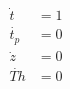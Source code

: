 \documentclass[10pt]{article}
\begin{document}
\begin{align*}\dot{t} & = 1 \\
\dot{t_p} & =0 \\
\dot{z} & =0 \\
\dot{Th} & = 0 \end{align*}
\end{document}
